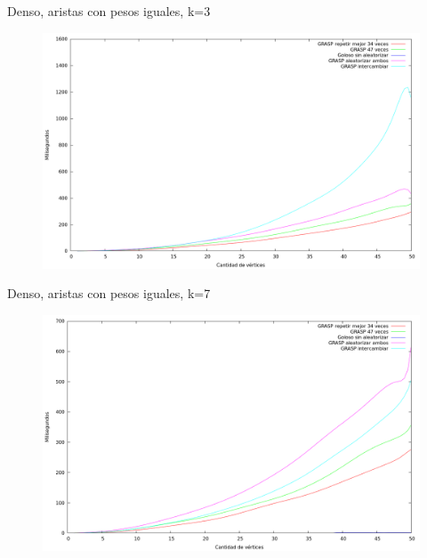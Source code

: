 \vspace*{0.5cm}

Denso, aristas con pesos iguales, k=3
\vspace*{0.5cm}

\begin{figure}[H]
  \begin{center}
    \includegraphics[scale=0.35]{imagenes/ej6-denso-pesos-iguales-k3-tiempo.png}
  \end{center}
\end{figure}

\vspace*{0.5cm}

Denso, aristas con pesos iguales, k=7
\vspace*{0.5cm}

\begin{figure}[H]
  \begin{center}
    \includegraphics[scale=0.35]{imagenes/ej6-denso-pesos-iguales-k7-tiempo.png}
  \end{center}
\end{figure}

